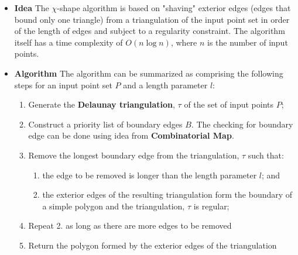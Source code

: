 \documentclass[preprint,5p,times,twocolumn]{elsarticle}
\begin{document}
\begin{itemize}
	\item \textbf{Idea} The $\chi$-shape algorithm is based on "shaving" exterior edges (edges that bound only one triangle) from a triangulation of the input point set in order of the length of edges and subject to a regularity constraint. The algorithm itself has a time complexity of $O(n\log n)$, where $n$ is the number of input points.

	\item \textbf{Algorithm}
The algorithm can be summarized as comprising the following steps for an input point set $P$ and a length parameter $l$:
\begin{enumerate}
	\item Generate the \textbf{Delaunay triangulation}, $\tau$ of the set of input points $P$;
    \item Construct a priority list of boundary edges $B$. The checking for boundary edge can be done using idea from \textbf{Combinatorial Map}.
	\item Remove the longest boundary edge from the triangulation, $\tau$ such that:
	\begin{enumerate}
		\item the edge to be removed is longer than the length parameter $l$; and
		\item the exterior edges of the resulting triangulation form the boundary of a simple polygon and the triangulation, $\tau$ is regular;
    \end{enumerate}
    \item Repeat 2. as long as there are more edges to be removed
	\item Return the polygon formed by the exterior edges of the triangulation
\end{enumerate}
\end{itemize}
\end{document}

